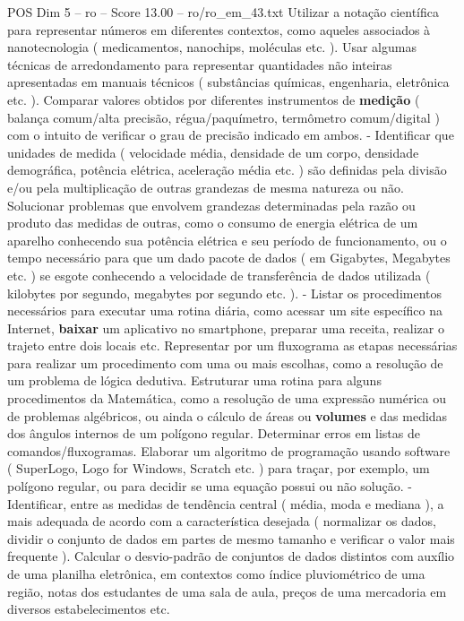 \begin{textsample}{POS Dim 5 – ro – Score 13.00 – ro/ro\_em\_43.txt}
Utilizar a notação científica para representar números em diferentes contextos, como aqueles associados à nanotecnologia ( medicamentos, nanochips, moléculas etc. ).
Usar algumas técnicas de arredondamento para representar quantidades não inteiras apresentadas em manuais técnicos ( substâncias químicas, engenharia, eletrônica etc. ).
Comparar valores obtidos por diferentes instrumentos de \textbf{medição} ( balança comum/alta precisão, régua/paquímetro, termômetro comum/digital ) com o intuito de verificar o grau de precisão indicado em ambos. - Identificar que unidades de medida ( velocidade média, densidade de um corpo, densidade demográfica, potência elétrica, aceleração média etc. ) são definidas pela divisão e/ou pela multiplicação de outras grandezas de mesma natureza ou não.
Solucionar problemas que envolvem grandezas determinadas pela razão ou produto das medidas de outras, como o consumo de energia elétrica de um aparelho conhecendo sua potência elétrica e seu período de funcionamento, ou o tempo necessário para que um dado pacote de dados ( em Gigabytes, Megabytes etc. ) se esgote conhecendo a velocidade de transferência de dados utilizada ( kilobytes por segundo, megabytes por segundo etc. ). - Listar os procedimentos necessários para executar uma rotina diária, como acessar um site específico na Internet, \textbf{baixar} um aplicativo no smartphone, preparar uma receita, realizar o trajeto entre dois locais etc.
Representar por um fluxograma as etapas necessárias para realizar um procedimento com uma ou mais escolhas, como a resolução de um problema de lógica dedutiva.
Estruturar uma rotina para alguns procedimentos da Matemática, como a resolução de uma expressão numérica ou de problemas algébricos, ou ainda o cálculo de áreas ou \textbf{volumes} e das medidas dos ângulos internos de um polígono regular.
Determinar erros em listas de comandos/fluxogramas.
Elaborar um algoritmo de programação usando software ( SuperLogo, Logo for Windows, Scratch etc. ) para traçar, por exemplo, um polígono regular, ou para decidir se uma equação possui ou não solução. - Identificar, entre as medidas de tendência central ( média, moda e mediana ), a mais adequada de acordo com a característica desejada ( normalizar os dados, dividir o conjunto de dados em partes de mesmo tamanho e verificar o valor mais frequente ).
Calcular o desvio-padrão de conjuntos de dados distintos com auxílio de uma planilha eletrônica, em contextos como índice pluviométrico de uma região, notas dos estudantes de uma sala de aula, preços de uma mercadoria em diversos estabelecimentos etc.

\end{textsample}
